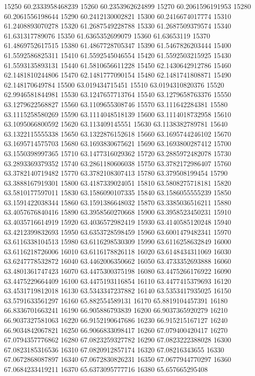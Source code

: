{15250 60.2333958468239
15260 60.2353962624899
15270 60.2061596191953
15280 60.2061556198644
15290 60.2412130002821
15300 60.2416674017774
15310 61.2408893070278
15320 61.2687549228788
15330 61.2687509379574
15340 61.631317789076
15350 61.6365352699079
15360 61.63653119
15370 61.4869752617515
15380 61.4867728705347
15390 61.5467826203444
15400 61.5592586825311
15410 61.5592545046554
15420 61.5592503215925
15430 61.5593135893131
15440 61.5810656611228
15450 62.1430642912786
15460 62.1481810244806
15470 62.1481777090154
15480 62.1481741808871
15490 62.148170649784
15500 63.019434715451
15510 63.0194310820376
15520 62.9946581844981
15530 63.1247657713764
15540 63.1279658763376
15550 63.1279622568827
15560 63.1109655308746
15570 63.111642284381
15580 63.1115258580269
15590 63.1114048518139
15600 63.1114018732958
15610 63.1095066800592
15620 63.113409145551
15630 63.1138382789781
15640 63.1322115555338
15650 63.1322876152618
15660 63.1695744246102
15670 63.1695714575703
15680 63.1693830675621
15690 63.1693800287412
15700 63.1550398997365
15710 63.1477316029362
15720 63.2885972482078
15730 63.2893369379352
15740 63.2861180606038
15750 63.3782172986407
15760 63.3782140719482
15770 63.3782108307413
15780 63.379508199454
15790 63.3888167919301
15800 63.4187339024051
15810 63.5808275718181
15820 63.5810177597011
15830 63.1586090107335
15840 63.1586055555239
15850 63.1591422038344
15860 63.1591386648032
15870 63.3385036516211
15880 63.4057676840416
15890 63.3958560270668
15900 63.3958523450231
15910 63.4035716614919
15920 63.4036572982419
15930 63.4140585120248
15940 63.4212399832693
15950 63.6353728598459
15960 63.6001479482341
15970 63.6116338104513
15980 63.6116298530309
15990 63.6116258632849
16000 63.6116218726006
16010 63.6116178826118
16020 63.6148434311069
16030 63.6247778532872
16040 63.4462006350662
16050 63.4733352693888
16060 63.4801361747423
16070 63.4475300375198
16080 63.4475266176922
16090 63.4475229664409
16100 63.4475193116854
16110 63.4477415379693
16120 63.4531719812018
16130 63.5343347237882
16140 63.5353417935025
16150 63.5791633561297
16160 65.882554589131
16170 65.8819104457391
16180 66.8336701663241
16190 66.905886793839
16200 66.9037365920279
16210 66.9037327581063
16220 66.9152190647686
16230 66.915215167127
16240 66.9034842067821
16250 66.9066833098417
16260 67.079400420417
16270 67.0794357776862
16280 67.0823259327782
16290 67.0823222388028
16300 67.0823185316536
16310 67.0820912857174
16320 67.08216343655
16330 67.0672868087897
16340 67.0672830826231
16350 67.0677944770297
16360 67.0684233419211
16370 65.6373095777716
16380 65.657665295408
}
